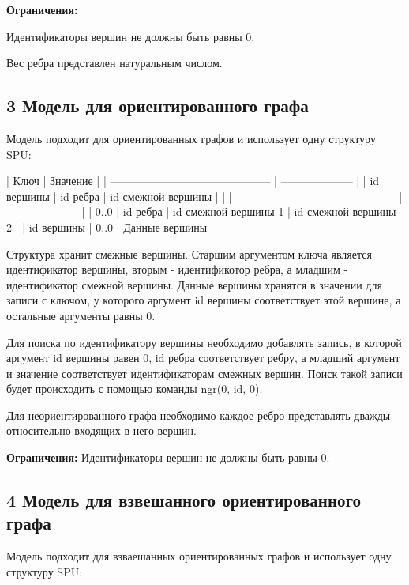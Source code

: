 {\bfseries Ограничения\+:}
\begin{DoxyEnumerate}
\item Идентификаторы вершин не должны быть равны 0.
\item Вес ребра представлен натуральным числом.
\end{DoxyEnumerate}\hypertarget{md_docs__xD0_x93_xD1_x80_xD0_xB0_xD1_x84_xD0_xBE_xD0_xB2_xD1_x8B_xD0_xB5__xD0_xBC_xD0_xBE_xD0_xB4_xD0_xB5_xD0_xBB_xD0_xB8_autotoc_md6}{}\subsection{3 Модель для ориентированного графа}\label{md_docs__xD0_x93_xD1_x80_xD0_xB0_xD1_x84_xD0_xBE_xD0_xB2_xD1_x8B_xD0_xB5__xD0_xBC_xD0_xBE_xD0_xB4_xD0_xB5_xD0_xBB_xD0_xB8_autotoc_md6}
Модель подходит для ориентированных графов и использует одну структуру S\+PU\+:


\begin{DoxyCode}
| Ключ                                         | Значение             |
| -------------------------------------------- | -------------------- |
| id вершины | id ребра | id смежной вершины   |                      |
| -----------| ------------------------------- | -------------------- |
| 0..0       | id ребра | id смежной вершины 1 | id смежной вершины 2 | 
| id вершины | 0..0                            | Данные вершины       | 
\end{DoxyCode}


Структура хранит смежные вершины. Старшим аргументом ключа является идентификатор вершины, вторым -\/ идентификотор ребра, а младшим -\/ идентификатор смежной вершины. Данные вершины хранятся в значении для записи с ключом, у которого аргумент {\ttfamily id вершины} соответствует этой вершине, а остальные аргументы равны 0.

Для поиска по идентификатору вершины необходимо добавлять запись, в которой аргумент {\ttfamily id вершины} равен 0, {\ttfamily id ребра} соответствует ребру, а младший аргумент и значение соответствует идентификаторам смежных вершин. Поиск такой записи будет происходить с помощью команды {\ttfamily ngr(0, id, 0)}.

Для неориентированного графа необходимо каждое ребро представлять дважды относительно входящих в него вершин.

{\bfseries Ограничения\+:} Идентификаторы вершин не должны быть равны 0.\hypertarget{md_docs__xD0_x93_xD1_x80_xD0_xB0_xD1_x84_xD0_xBE_xD0_xB2_xD1_x8B_xD0_xB5__xD0_xBC_xD0_xBE_xD0_xB4_xD0_xB5_xD0_xBB_xD0_xB8_autotoc_md7}{}\subsection{4 Модель для взвешанного ориентированного графа}\label{md_docs__xD0_x93_xD1_x80_xD0_xB0_xD1_x84_xD0_xBE_xD0_xB2_xD1_x8B_xD0_xB5__xD0_xBC_xD0_xBE_xD0_xB4_xD0_xB5_xD0_xBB_xD0_xB8_autotoc_md7}
Модель подходит для взваешанных ориентированных графов и использует одну структуру S\+PU\+:


